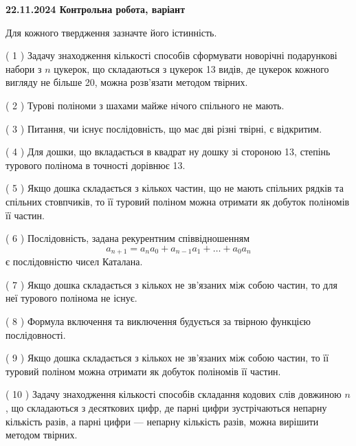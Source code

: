 \documentclass[12pt, ukrainian]{article}
\begin{document}
\begin {large}

\textbf{22.11.2024 Контрольна робота, варіант  }\par


{
Для кожного твердження зазначте його істинність.\par
\vspace{2mm}
( 1 ) Задачу знаходження кількості способів сформувати новорічні подарункові набори з $n$ цукерок, що складаються з цукерок 13 видів, де цукерок кожного вигляду не більше 20, можна розв’язати методом твірних.%

( 2 ) Турові поліноми з шахами майже нічого спільного не мають.%

( 3 ) Питання, чи існує послідовність, що має дві різні твірні, є відкритим.%

( 4 ) Для дошки, що вкладається в квадрат ну дошку зі стороною 13, степінь турового полінома в точності дорівнює 13.%

( 5 ) Якщо дошка складається з кількох частин, що не мають спільних рядків та спільних стовпчиків, то її туровий поліном можна отримати як добуток поліномів її частин.%

( 6 ) Послідовність, задана рекурентним співвідношенням $$a_{n+1}=a_{n}a_{0}+a_{n-1}a_{1}+\ldots+a_0a_{n}$$ є послідовністю чисел Каталана.%

( 7 ) Якщо дошка складається з кількох не зв’язаних між собою частин, то для неї турового полінома не існує.%

( 8 ) Формула включення та виключення будується за твірною функцією послідовності.%

( 9 ) Якщо дошка складається з кількох не зв’язаних між собою частин, то її туровий поліном можна отримати як добуток поліномів її частин.%

( 10 ) Задачу знаходження кількості способів складання кодових слів довжиною $n$, що складаються з десяткових цифр, де парні цифри зустрічаються непарну кількість разів, а парні цифри — непарну кількість разів, можна вирішити методом твірних.%


\vspace{5mm}
}
\end {large}
\end{document}
